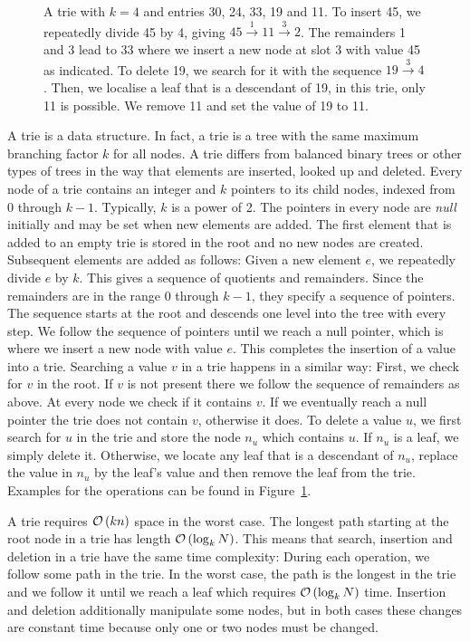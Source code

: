 \begin{figure}
	\centering
	
	\caption{ \small A trie with $k = 4$ and entries 30, 24, 33, 19 and 11.
		To insert 45, we repeatedly divide 45 by 4, giving
			$45 \overset{1}{\longrightarrow} 11  \overset{3}{\longrightarrow} 2$.
		The remainders 1 and 3 lead to 33 where we insert a new node at slot 3 with value 45 as indicated.
		To delete 19, we search for it with the sequence $19 \overset{3}{\longrightarrow} 4$.
		Then, we localise a leaf that is a descendant of 19, in this trie, only 11 is possible.
		We remove 11 and set the value of 19 to 11.
		\label{fig:trie}}
\end{figure}


A trie \cite{knuth:tries} is a data structure.
In fact, a trie is a tree with the same maximum branching factor $k$ for all nodes.
A trie differs from balanced binary trees or other types of trees in the way that elements are inserted, looked up and deleted.
Every node of a trie contains an integer and $k$ pointers to its child nodes, indexed from 0 through $k - 1$.
Typically, $k$ is a power of 2.
The pointers in every node are \emph{null} initially and may be set when new elements are added.
The first element that is added to an empty trie is stored in the root and no new nodes are created.
Subsequent elements are added as follows:
Given a new element $e$, we repeatedly divide $e$ by $k$.
This gives a sequence of quotients and remainders.
Since the remainders are in the range 0 through $k - 1$, they specify a sequence of pointers.
The sequence starts at the root and descends one level into the tree with every step.
We follow the sequence of pointers until we reach a null pointer, which is where we insert a new node with value $e$.
This completes the insertion of a value into a trie.
Searching a value $v$ in a trie happens in a similar way:
First, we check for $v$ in the root.
If $v$ is not present there we follow the sequence of remainders as above.
At every node we check if it contains $v$.
If we eventually reach a null pointer the trie does not contain $v$, otherwise it does.
To delete a value $u$, we first search for $u$ in the trie and store the node $n_u$ which contains $u$.
If $n_u$ is a leaf, we simply delete it.
Otherwise, we locate any leaf that is a descendant of $n_u$, replace the value in $n_u$ by the leaf's value and then remove the leaf from the trie.
Examples for the operations can be found in Figure~\ref{fig:trie}.

A trie requires $\mathcal{O}\left(kn\right)$ space in the worst case.
The longest path starting at the root node in a trie has length $\mathcal{O}\left(\log_k N\right)$.
This means that search, insertion and deletion in a trie have the same time complexity:
During each operation, we follow some path in the trie.
In the worst case, the path is the longest in the trie and we follow it until we reach a leaf which requires $\mathcal{O}\left(\log_k N\right)$ time.
Insertion and deletion additionally manipulate some nodes, but in both cases these changes are constant time because only one or two nodes must be changed.
